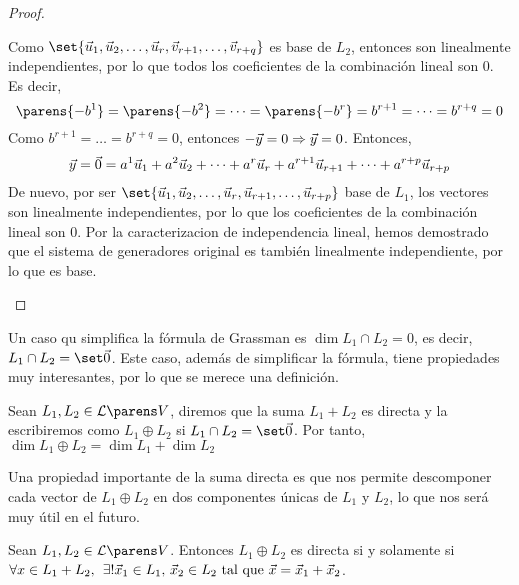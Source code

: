 \documentclass[../algebra_lineal.tex]{subfiles}
\begin{document}
\begin{proof}
\begin{enumerate}
\[        \]
        Como $\set{\vlst{u}{r}, \vv_{r+1}, \dots, \vv_{r+q}}$ es base de $L_2$, entonces son linealmente independientes, por lo que todos los coeficientes de la combinación lineal son 0. Es decir,
        \[
            \parens{-b^1} = \parens{-b^2} = \dots = \parens{-b^r} = b^{r+1} = \dots = b^{r+q} = 0
        \]
        Como $b^{r+1} = \dots = b^{r+q} = 0$, entonces $-\vec{y} = 0 \Rightarrow \vec{y} = 0$. Entonces,
        \[
            \vec{y} = \vec{0} = {a}^{1}\vec{u}_{1}+{a}^{2}\vec{u}_{2}+\dots+{a}^{r}\vec{u}_{r} + a^{r+1}\vec{u}_ {r+1} + \dots + a^{r+p}\vec{u}_{r+p} 
        \]
        De nuevo, por ser $\set{\vlst{u}{r}, \vu_{r+1}, \dots, \vu_{r+p}}$ base de $L_1$, los vectores son linealmente independientes, por lo que los coeficientes de la combinación lineal son 0. Por la caracterizacion de independencia lineal, hemos demostrado que el sistema de generadores original es también linealmente independiente, por lo que es base.
    \end{enumerate}
\end{proof}

Un caso qu simplifica la fórmula de Grassman es $\dim{L_1 \cap L_2} = 0$, es decir, $L_1 \cap L_2 = \zvs$. Este caso, además de simplificar la fórmula, tiene propiedades muy interesantes, por lo que se merece una definición.

\begin{definition}
    Sean $L_1, L_2 \in \subespaciosde{V}$, diremos que la suma $L_1 + L_2$ es directa y la escribiremos como $L_1 \oplus L_2$ si $L_1 \cap L_2 = \zvs$. Por tanto, $\dim{L_1 \oplus L_2} = \dim{L_1} + \dim{L_2}$   
\end{definition}

Una propiedad importante de la suma directa es que nos permite descomponer cada vector de $L_1 \oplus L_2$ en dos componentes únicas de $L_1$ y $L_2$, lo que nos será muy útil en el futuro.

\begin{proposition}
    Sean $L_1, L_2 \in \subespaciosde{V}$. Entonces $L_1 \oplus L_2$ es directa si y solamente si $\forall x \in L_1 + L_2, \hspace{1.5mm} \exists! \vec{x}_1 \in L_1, \, \vec{x}_2 \in L_2  \mathrm{\,\, tal \,\, que \,\,} \vec{x} = \vec{x}_1 + \vec{x}_2$.
\end{proposition}
\end{document}

